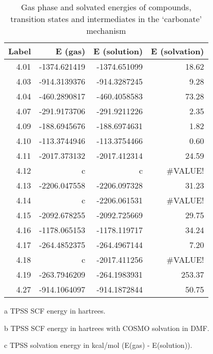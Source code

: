 \begin{table}[!htb]
\centering
 \begin{threeparttable}
  \caption[Gas phase and solvated energies for the `carbonate' mechanism]{Gas phase and solvated energies of compounds, transition states and intermediates in the `carbonate' mechanism}
    \begin{tabular}{rrrr}
    \toprule
    Label & E (gas)\tnote{a} & E (solution)\tnote{b} & E (solvation)\tnote{c} \\
    \midrule
    4.01  & -1374.621419 & -1374.651099 & 18.62 \\
    4.03  & -914.3139376 & -914.3287245 & 9.28 \\
    4.04  & -460.2890817 & -460.4058583 & 73.28 \\
    4.07  & -291.9173706 & -291.9211226 & 2.35 \\
    4.09  & -188.6945676 & -188.6974631 & 1.82 \\
    4.10  & -113.3744946 & -113.3754466 & 0.60 \\
    4.11  & -2017.373132 & -2017.412314 & 24.59 \\
    4.12  & c            & c            & \#VALUE! \\
    4.13  & -2206.047558 & -2206.097328 & 31.23 \\
    4.14  & c            & -2206.061531 & \#VALUE! \\
    4.15  & -2092.678255 & -2092.725669 & 29.75 \\
    4.16  & -1178.065153 & -1178.119717 & 34.24 \\
    4.17  & -264.4852375 & -264.4967144 & 7.20 \\
    4.18  & c            & -2017.411256 & \#VALUE! \\
    4.19  & -263.7946209 & -264.1983931 & 253.37 \\
    4.27  & -914.1064097 & -914.1872844 & 50.75 \\
    \bottomrule
    \end{tabular}%
    \begin{tablenotes}
    \item [a] TPSS SCF energy in hartrees.
    \item [b] TPSS SCF energy in hartrees with COSMO solvation in DMF.
    \item [c] TPSS solvation energy in kcal/mol (E(gas) - E(solution)).
    \end{tablenotes}
  \label{tab.carbenergy}%
 \end{threeparttable}
\end{table}%


